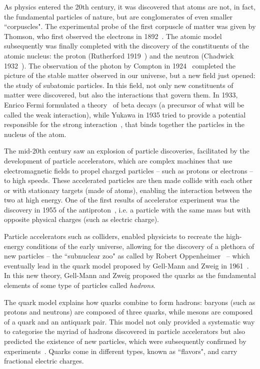 As physics entered the 20th century, it was discovered that atoms are not, in fact, the fundamental particles of nature, but are conglomerates of even smaller ``corpuscles". The experimental probe of the first corpuscle of matter was given by Thomson, who first observed the electrons in 1892~\cite{doi:10.1080/14786449708621070}. The atomic model subsequently was finally completed with the discovery of the constituents of the atomic nucleus: the proton (Rutherford 1919~\cite{doi:10.1080/14786440608635919}) and the neutron (Chadwick 1932~\cite{Chadwick:1932ma}). The observation of the photon by Compton in 1924~\cite{PhysRev.21.483, PhysRev.24.591} completed the picture of the stable matter observed in our universe, but a new field just opened: the study of subatomic particles. In this field, not only new constituents of matter were discovered, but also the interactions that govern them. In 1933, Enrico Fermi formulated a theory~\cite{Fermi:1934hr} of beta decays (a precursor of what will be called the weak interaction), while Yukawa in 1935 tried to provide a potential responsible for the strong interaction~\cite{Yukawa:1935xg}, that binds together the particles in the nucleus of the atom. 

The mid-20th century saw an explosion of particle discoveries, facilitated by the development of particle accelerators, which are complex machines that use electromagnetic fields to propel charged particles -- such as protons or electrons -- to high speeds. These accelerated particles are then made collide with each other or with stationary targets (made of atoms), enabling the interaction between the two at high energy. One of the first results of accelerator experiment was the discovery in 1955 of the antiproton~\cite{PhysRev.100.947}, i.e. a particle with the same mass but with opposite physical charges (such as electric charge). 

Particle accelerators such as colliders, enabled physicists to recreate the high-energy conditions of the early universe, allowing for the discovery of a plethora of new particles -- the ``subnuclear zoo" as called by Robert Oppenheimer~\cite{johnson2010strange} -- which eventually lead in the quark model proposed by Gell-Mann and Zweig in 1961~\cite{Gell-Mann:1964ewy}. In this new theory,  Gell-Mann and Zweig proposed the quarks as the fundamental elements of some type of particles called \textit{hadrons}. 

The quark model explains how quarks combine to form hadrons: baryons (such as protons and neutrons) are composed of three quarks, while mesons are composed of a quark and an antiquark pair.  This model not only provided a systematic way to categorise the myriad of hadrons discovered in particle accelerators but also predicted the existence of new particles, which were subsequently confirmed by experiments~\cite{PhysRevLett.12.204}. Quarks come in different types, known as ``flavors", and carry fractional electric charges. 


